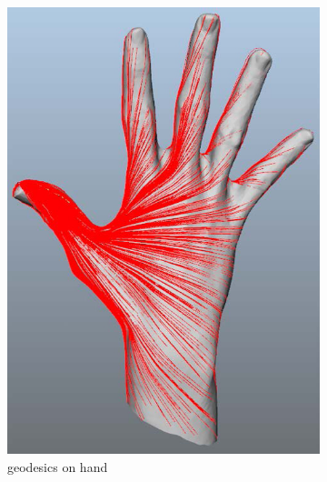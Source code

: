 \begin{figure}
		\ContinuedFloat
        \centering

        \begin{subfigure}[b]{0.5\textwidth}
                \includegraphics[width=\textwidth]{../images/geodesic_image/hand2-1}
                \caption{geodesics on hand}
                \label{fig:hand}
        \end{subfigure}%
        ~ %
        \begin{subfigure}[b]{0.5\textwidth}

\end{subfigure}
\end{figure}
